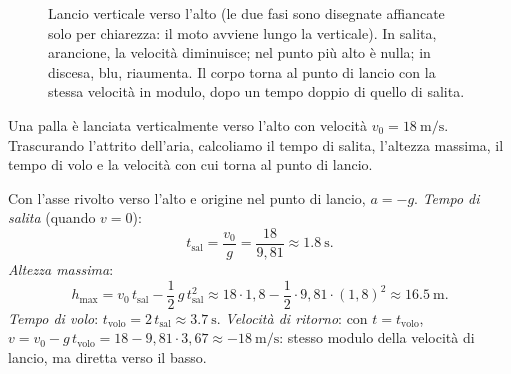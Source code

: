 \begin{figure}[!htbp]
    \centering
    \caption{Lancio verticale verso l'alto (le due fasi sono disegnate affiancate solo per chiarezza: il moto avviene lungo la verticale). In salita, arancione, la velocità diminuisce; nel punto più alto è nulla; in discesa, blu, riaumenta. Il corpo torna al punto di lancio con la stessa velocità in modulo, dopo un tempo doppio di quello di salita.}
    \label{fig:lancio-verticale}
\end{figure}

\begin{testexample}
Una palla è lanciata verticalmente verso l'alto con velocità $v_0 = \SI{18}{\metre\per\second}$. Trascurando l'attrito dell'aria, calcoliamo il tempo di salita, l'altezza massima, il tempo di volo e la velocità con cui torna al punto di lancio.

Con l'asse rivolto verso l'alto e origine nel punto di lancio, $a = -g$.
\emph{Tempo di salita} (quando $v = 0$):
\[ t_\text{sal} = \frac{v_0}{g} = \frac{18}{9{,}81} \approx \SI{1,8}{\second}. \]
\emph{Altezza massima}:
\[ h_\text{max} = v_0\,t_\text{sal} - \frac{1}{2}\,g\,t_\text{sal}^2 \approx 18 \cdot 1{,}8 - \frac{1}{2}\cdot 9{,}81 \cdot (1{,}8)^2 \approx \SI{16,5}{\metre}. \]
\emph{Tempo di volo}: $t_\text{volo} = 2\,t_\text{sal} \approx \SI{3,7}{\second}$.
\emph{Velocità di ritorno}: con $t = t_\text{volo}$, $v = v_0 - g\,t_\text{volo} = 18 - 9{,}81\cdot 3{,}67 \approx \SI{-18}{\metre\per\second}$: stesso modulo della velocità di lancio, ma diretta verso il basso.
\end{testexample}

